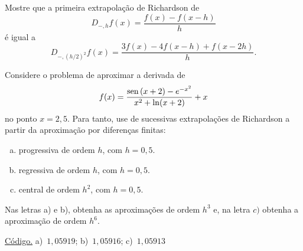\begin{exer}
  Mostre que a primeira extrapolação de Richardson de
  \begin{equation}
    D_{-,h}f(x) = \frac{f(x)-f(x-h)}{h}
  \end{equation}
é igual a
\begin{equation}
  D_{-,(h/2)^2}f(x) = \frac{3f(x)-4f(x-h)+f(x-2h)}{h}.
\end{equation}
\end{exer}

\begin{exer}\label{exer:df_fun}
  Considere o problema de aproximar a derivada de 
  \begin{equation}
    f(x) = \frac{\operatorname{sen}\,(x+2) - e^{-x^2}}{x^2 + \ln(x+2)}+x
  \end{equation}
no ponto $x=2,5$. Para tanto, use de sucessivas extrapolações de Richardson a partir da aproximação por diferenças finitas:
\begin{enumerate}[a)]
\item progressiva de ordem $h$, com $h=0,5$.
\item regressiva de ordem $h$, com $h=0,5$.
\item central de ordem $h^2$, com $h=0,5$.
\end{enumerate}
Nas letras a) e b), obtenha as aproximações de ordem $h^3$ e, na letra $c)$ obtenha a aproximação de ordem $h^6$.
\end{exer}
\begin{resp}
  \ifisoctave 
  \href{https://github.com/phkonzen/notas/blob/master/src/MatematicaNumerica/cap_deriv/dados/exer_Richardson_fun/exer_Richardson_fun.m}{Código.} 
  \fi
  a)~$1,05919$; b)~$1,05916$; c)~$1,05913$
\end{resp}
